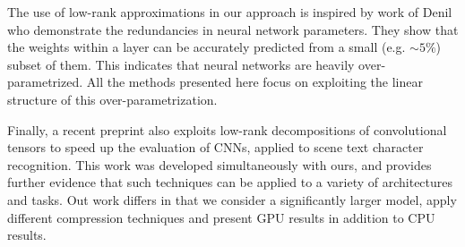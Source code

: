 The use of low-rank approximations in our approach is inspired by work
of Denil \etal \cite{denil2013predicting} who demonstrate the redundancies in neural
network parameters. They show that the weights within a layer can be
accurately predicted from a small (e.g. $\sim 5\%$) subset of them. This
indicates that neural networks are heavily over-parametrized.  All the
methods presented here focus on exploiting the linear structure of this
over-parametrization.

Finally, a recent preprint \cite{zisserman14} also exploits low-rank decompositions
of convolutional tensors to speed up the evaluation of CNNs, applied to scene text character
recognition. This work was developed simultaneously with ours, and provides 
further evidence that such techniques can be applied to a variety of architectures 
and tasks. 
Out work differs in that we consider a significantly larger model, apply different compression techniques and present GPU results in addition to CPU results. 


